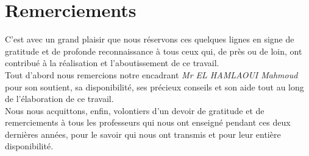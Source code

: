 \chapter*{Remerciements}

C’est avec un grand plaisir que nous réservons ces quelques lignes en signe de gratitude et de profonde reconnaissance à tous ceux qui, de près ou de loin, ont contribué à la réalisation et l’aboutissement de ce travail.  \\
  
Tout d’abord  nous remercions notre encadrant \emph{Mr EL HAMLAOUI Mahmoud} pour son soutient, sa disponibilité, ses précieux conseils et son aide tout au long de l’élaboration de ce travail. \\

Nous nous acquittons, enfin, volontiers d’un devoir de gratitude et de remerciements à tous les professeurs qui nous ont enseigné pendant ces deux dernières années, pour le
savoir qui nous ont transmis et pour leur entière disponibilité.
\newpage
